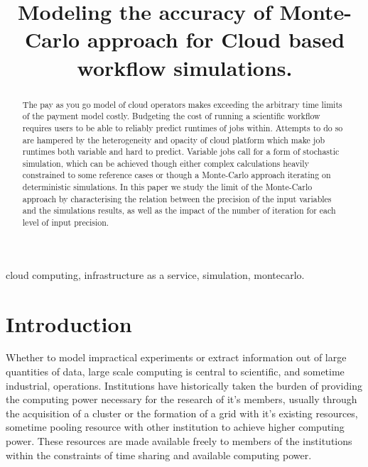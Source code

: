 \documentclass[10pt,conference,compsocconf]{IEEEtran}
\title{Modeling the accuracy of Monte-Carlo approach for Cloud based workflow simulations.}
\author{\IEEEauthorblockN{Luke~Bertot 
			and Stéphane~Genaud 
			and Julien~Gossa}
	\IEEEauthorblockA{Icube-ICPS --- UMR 7357, Univeristé de Strasbourg, CNRS\\
		P\^ole API Blvd S. Bant, 67400 Illkirch\\
		email: \url{lbertot@unistra.fr}, \url{gossa@unistra.fr}, \url{genaud@unistra.fr}}
	}
\begin{document}
\maketitle

\begin{abstract}
The pay as you go model of cloud operators makes exceeding the arbitrary time limits of the payment model costly. Budgeting the cost of running a scientific workflow requires users to be able to reliably predict runtimes of jobs within. Attempts to do so are hampered by the heterogeneity and opacity of cloud platform which make job runtimes both variable and hard to predict. Variable jobs call for a form of stochastic simulation, which can be achieved though either complex calculations heavily constrained to some reference cases or though a Monte-Carlo approach iterating on deterministic simulations. In this paper we study the limit of the Monte-Carlo approach by characterising the relation between the precision of the input variables and the simulations results, as well as the impact of the number of iteration for each level of input precision. 
\end{abstract}

\begin{IEEEkeywords}
cloud computing, infrastructure as a service, simulation, montecarlo.
\end{IEEEkeywords}

\section{Introduction}

Whether to model impractical experiments or extract information out of large quantities of data, large scale computing is central to scientific, and sometime industrial, operations. Institutions have historically taken the burden of providing the computing power necessary for the research of it's members, usually through the acquisition of a cluster or the formation of a grid with it's existing resources, sometime pooling resource with other institution to achieve higher computing power. These resources are made available freely to members of the institutions within the constraints of time sharing and available computing power. 
\end{document}
